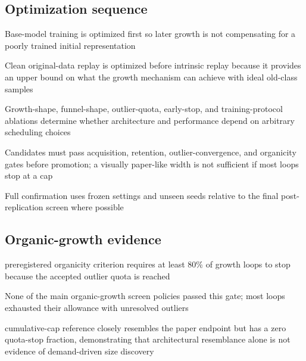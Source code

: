 \subsection{Optimization sequence}
\begin{draftpoints}
  \item Base-model training is optimized first so later growth is not compensating for a poorly trained initial representation
  \item Clean original-data replay is optimized before intrinsic replay because it provides an upper bound on what the growth mechanism can achieve with ideal old-class samples
  \item Growth-shape, funnel-shape, outlier-quota, early-stop, and training-protocol ablations determine whether architecture and performance depend on arbitrary scheduling choices
  \item Candidates must pass acquisition, retention, outlier-convergence, and organicity gates before promotion; a visually paper-like width is not sufficient if most loops stop at a cap
  \item Full confirmation uses frozen settings and unseen seeds relative to the final post-replication screen where possible
\end{draftpoints}

\subsection{Organic-growth evidence}
\begin{draftpoints}
  \item preregistered organicity criterion requires at least 80\% of growth loops to stop because the accepted outlier quota is reached
  \item None of the main organic-growth screen policies passed this gate; most loops exhausted their allowance with unresolved outliers
  \item cumulative-cap reference closely resembles the paper endpoint but has a zero quota-stop fraction, demonstrating that architectural resemblance alone is not evidence of demand-driven size discovery
\end{draftpoints}

